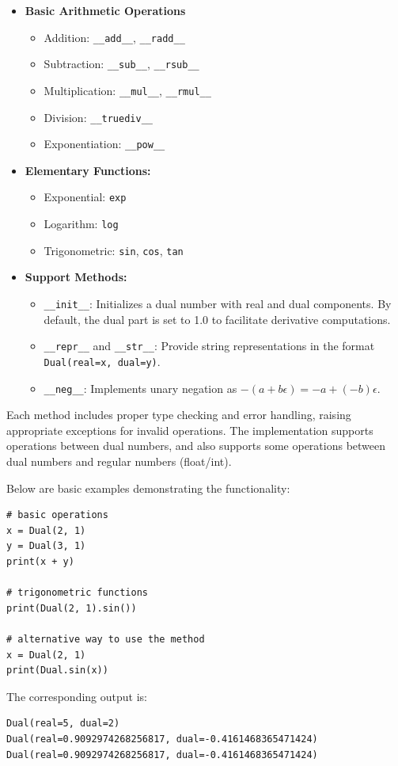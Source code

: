 \documentclass{article}
\begin{document}
\begin{itemize}
    \item \textbf{Basic Arithmetic Operations}
    \begin{itemize}
        \item Addition: \texttt{\_\_add\_\_}, \texttt{\_\_radd\_\_}
        \item Subtraction: \texttt{\_\_sub\_\_}, \texttt{\_\_rsub\_\_}
        \item Multiplication: \texttt{\_\_mul\_\_}, \texttt{\_\_rmul\_\_}
        \item Division: \texttt{\_\_truediv\_\_}
        \item Exponentiation: \texttt{\_\_pow\_\_}
    \end{itemize}
    
    \item \textbf{Elementary Functions:}
    \begin{itemize}
        \item Exponential: \texttt{exp}
        \item Logarithm: \texttt{log}
        \item Trigonometric: \texttt{sin}, \texttt{cos}, \texttt{tan}
    \end{itemize}
    
    \item \textbf{Support Methods:}
    \begin{itemize}
        \item \texttt{\_\_init\_\_}: Initializes a dual number with real and dual components. By default, the dual part is set to 1.0 to facilitate derivative computations.
        \item \texttt{\_\_repr\_\_} and \texttt{\_\_str\_\_}: Provide string representations in the format \texttt{Dual(real=x, dual=y)}.
        \item \texttt{\_\_neg\_\_}: Implements unary negation as \( -(a + b\epsilon) = -a + (-b)\epsilon \).
    \end{itemize}
\end{itemize}

Each method includes proper type checking and error handling, raising appropriate exceptions for invalid operations. The implementation supports operations between dual numbers, and also supports some operations between dual numbers and regular numbers (float/int).

Below are basic examples demonstrating the functionality:
\begin{lstlisting}[style=pythonstyle]
# basic operations
x = Dual(2, 1)
y = Dual(3, 1)
print(x + y)

# trigonometric functions
print(Dual(2, 1).sin())

# alternative way to use the method
x = Dual(2, 1)
print(Dual.sin(x))
\end{lstlisting}
The corresponding output is:
\begin{lstlisting}[style=input]
Dual(real=5, dual=2)
Dual(real=0.9092974268256817, dual=-0.4161468365471424)
Dual(real=0.9092974268256817, dual=-0.4161468365471424)
\end{lstlisting}
\end{document}
